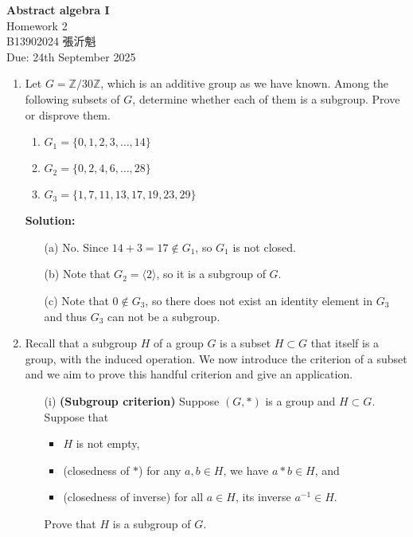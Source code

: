 \documentclass[12pt]{article}
\begin{document}
\begin{center}
    \Large \textbf{Abstract algebra I} \\
    \normalsize Homework 2 \\
    B13902024 張沂魁 \\
    Due: 24th September 2025
\end{center}

\bigskip

\begin{enumerate}
    \item Let $G = \mathbb{Z}/30\mathbb{Z}$, which is an additive group as we have known. Among the following
    subsets of $G$, determine whether each of them is a subgroup. Prove or disprove them.
    \begin{enumerate}
        \item $G_1 = \{0, 1, 2, 3, \dots , 14\}$
        \item $G_2 = \{0, 2, 4, 6, \dots , 28\}$
        \item $G_3 = \{1, 7, 11, 13, 17, 19, 23, 29\}$
    \end{enumerate}
    \textbf{Solution:} \begin{itemize}
        \item [(a)] No. Since \(14 + 3 = 17 \notin G_1\), so \(G_1\) is not closed. 
        \item [(b)] Note that \(G_2 = \langle 2 \rangle \), so it is a subgroup of \(G\). 
        \item [(c)] Note that \(0 \notin G_3\), so there does not exist an identity element in \(G_3\) and thus \(G_3\) can not be a subgroup.    
    \end{itemize}

    \item Recall that a subgroup $H$ of a group $G$ is a subset $H \subset G$ that itself is a group, with
    the induced operation. We now introduce the criterion of a subset and we aim to
    prove this handful criterion and give an application.
    \begin{enumerate}
        \item[(i)] \textbf{(Subgroup criterion)} Suppose $(G, \ast)$ is a group and $H \subset G$. Suppose that
        \begin{itemize}
            \item $H$ is not empty,
            \item (closedness of $\ast$) for any $a, b \in H$, we have $a \ast b \in H$, and
            \item (closedness of inverse) for all $a \in H$, its inverse $a^{-1} \in H$.
        \end{itemize}
        Prove that $H$ is a subgroup of $G$.


\end{enumerate}
\end{enumerate}
\end{document}
